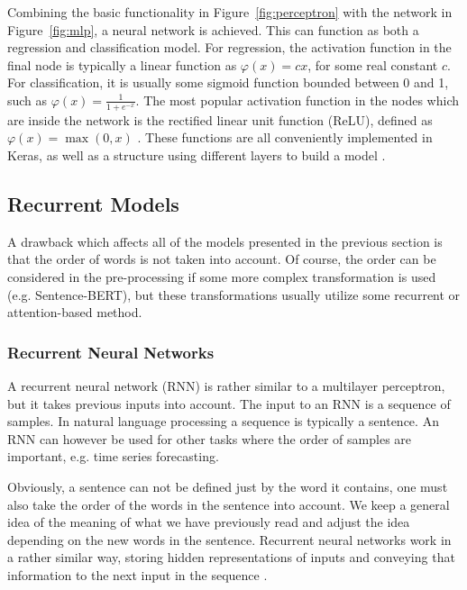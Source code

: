 Combining the basic functionality in Figure~\ref{fig:perceptron} with the network in Figure~\ref{fig:mlp}, a neural network is achieved. This can function as both a regression and classification model. For regression, the activation function in the final node is typically a linear function as $\varphi(x) = cx$, for some real constant $c$. For classification, it is usually some sigmoid function bounded between 0 and 1, such as $\displaystyle{\varphi(x) = \frac{1}{1 + e^{-x}}}$. The most popular activation function in the nodes which are inside the network is the rectified linear unit function (ReLU), defined as $\varphi(x) = \max(0,x)$ \citep{Goodfellow-et-al-2016}. These functions are all conveniently implemented in Keras, as well as a structure using different layers to build a model \citep{chollet2020keras}. 

\subsection{Recurrent Models}\label{sec:recmods}

A drawback which affects all of the models presented in the previous section is that the order of words is not taken into account. Of course, the order can be considered in the pre-processing if some more complex transformation is used (e.g. Sentence-BERT), but these transformations usually utilize some recurrent or attention-based method. 

\subsubsection{Recurrent Neural Networks}

A recurrent neural network (RNN) is rather similar to a multilayer perceptron, but it takes previous inputs into account. The input to an RNN is a sequence of samples. In natural language processing a sequence is typically a sentence. An RNN can however be used for other tasks where the order of samples are important, e.g. time series forecasting.

Obviously, a sentence can not be defined just by the word it contains, one must also take the order of the words in the sentence into account. We keep a general idea of the meaning of what we have previously read and adjust the idea depending on the new words in the sentence. Recurrent neural networks work in a rather similar way, storing hidden representations of inputs and conveying that information to the next input in the sequence \citep{Goodfellow-et-al-2016}. 

